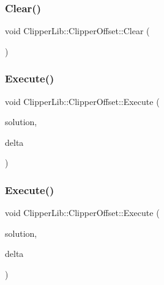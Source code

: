 \mbox{\label{class_clipper_lib_1_1_clipper_offset_ab444433587b6a3f6c89655938d889c7d}} 
\subsubsection{\texorpdfstring{Clear()}{Clear()}}
{\footnotesize\ttfamily void Clipper\+Lib\+::\+Clipper\+Offset\+::\+Clear (\begin{DoxyParamCaption}{ }\end{DoxyParamCaption})}

\mbox{\label{class_clipper_lib_1_1_clipper_offset_ac591b25e483a52c99c3190a256ad4589}} 
\subsubsection{\texorpdfstring{Execute()}{Execute()}\hspace{0.1cm}{\footnotesize\ttfamily [1/2]}}
{\footnotesize\ttfamily void Clipper\+Lib\+::\+Clipper\+Offset\+::\+Execute (\begin{DoxyParamCaption}\item[{\mbox{\hyperlink{namespace_clipper_lib_a4bab1d9e10805fa6f1fd3b78c56efcfe}{Paths}} \&}]{solution,  }\item[{double}]{delta }\end{DoxyParamCaption})}

\mbox{\label{class_clipper_lib_1_1_clipper_offset_a3aaa9fcc20e503c967a23f1793536118}} 
\subsubsection{\texorpdfstring{Execute()}{Execute()}\hspace{0.1cm}{\footnotesize\ttfamily [2/2]}}
{\footnotesize\ttfamily void Clipper\+Lib\+::\+Clipper\+Offset\+::\+Execute (\begin{DoxyParamCaption}\item[{\mbox{\hyperlink{class_clipper_lib_1_1_poly_tree}{Poly\+Tree}} \&}]{solution,  }\item[{double}]{delta }\end{DoxyParamCaption})}



